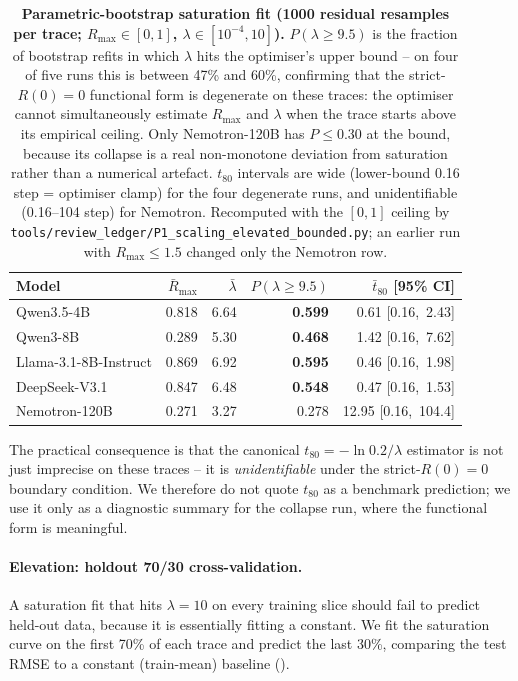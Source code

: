 \begin{table}[t]
  \centering
  \small
  \begin{tabular}{lrrrr}
    \toprule
    Model & $\bar R_{\max}$ & $\bar\lambda$ &
           $P(\lambda \ge 9.5)$ & $\bar t_{80}$ [95\% CI] \\
    \midrule
    Qwen3.5-4B            & 0.818 & 6.64 & \textbf{0.599} & 0.61 [0.16,\ 2.43] \\
    Qwen3-8B              & 0.289 & 5.30 & \textbf{0.468} & 1.42 [0.16,\ 7.62] \\
    Llama-3.1-8B-Instruct & 0.869 & 6.92 & \textbf{0.595} & 0.46 [0.16,\ 1.98] \\
    DeepSeek-V3.1         & 0.847 & 6.48 & \textbf{0.548} & 0.47 [0.16,\ 1.53] \\
    Nemotron-120B         & 0.271 & 3.27 & 0.278          & 12.95 [0.16,\ 104.4] \\
    \bottomrule
  \end{tabular}
  \caption{\textbf{Parametric-bootstrap saturation fit (1000 residual
    resamples per trace; $R_{\max} \in [0,1]$, $\lambda \in [10^{-4}, 10]$).}  $P(\lambda \ge 9.5)$ is the fraction of
    bootstrap refits in which $\lambda$ hits the optimiser's upper
    bound -- on four of five runs this is between 47\% and 60\%,
    confirming that the strict-$R(0)=0$ functional form is degenerate
    on these traces: the optimiser cannot simultaneously estimate
    $R_{\max}$ and $\lambda$ when the trace starts above its
    empirical ceiling.  Only Nemotron-120B has $P \le 0.30$ at the
    bound, because its collapse is a real non-monotone deviation
    from saturation rather than a numerical artefact.  $t_{80}$
    intervals are wide (lower-bound 0.16 step = optimiser clamp) for
    the four degenerate runs, and unidentifiable (0.16--104 step)
    for Nemotron.  Recomputed with the $[0,1]$ ceiling by
    \texttt{tools/review\_ledger/P1\_scaling\_elevated\_bounded.py}; an
    earlier run with $R_{\max}\le 1.5$ changed only the Nemotron row.}
  \label{tab:scaling-bootstrap}
\end{table}

The practical consequence is that the canonical $t_{80} = -\ln 0.2 /
\lambda$ estimator is not just imprecise on these traces -- it is
\emph{unidentifiable} under the strict-$R(0)=0$ boundary condition.
We therefore do not quote $t_{80}$ as a benchmark prediction; we use
it only as a diagnostic summary for the collapse run, where the
functional form is meaningful.

\paragraph{Elevation: holdout 70/30 cross-validation.}
\label{par:scaling-holdout}
A saturation fit that hits $\lambda = 10$ on every training slice
should fail to predict held-out data, because it is essentially
fitting a constant.  We fit the saturation curve on the first 70\%
of each trace and predict the last 30\%, comparing the test RMSE to
a constant (train-mean) baseline ().

